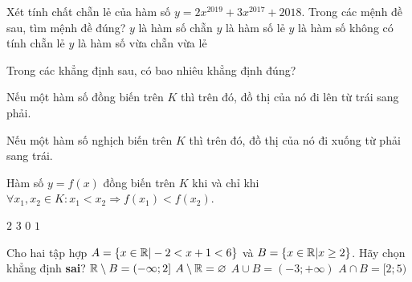\begin{ex}%
Xét tính chất chẵn lẻ của hàm số $y=2x^{2019}+3x^{2017}+2018$. Trong các mệnh đề sau, tìm
mệnh đề đúng?
	\choice
	{$y$ là hàm số chẵn}
	{$y$ là hàm số lẻ}
	{\True $y$ là hàm số không có tính chẵn lẻ}
	{$y$ là hàm số vừa chẵn vừa lẻ}
\end{ex}

\begin{ex}%
Trong các khẳng định sau, có bao nhiêu khẳng định đúng?
\begin{enumEX}[(I)]{1}
\item Nếu một hàm số đồng biến trên $K$ thì trên đó, đồ thị của nó đi lên từ trái sang phải.
\item Nếu một hàm số nghịch biến trên $K$ thì trên đó, đồ thị của nó đi xuống từ phải sang trái.
\item Hàm số $y=f(x)$ đồng biến trên $K$ khi và chỉ khi $\forall x_1, x_2\in K\colon x_1<x_2\Rightarrow f(x_1)<f(x_2)$.
\end{enumEX}
	\choice
	{\True $2$}
	{$3$}
	{$0$}
	{$1$}
\end{ex}

\begin{ex}%
Cho hai tập hợp $A=\{x\in \Bbb{R}|-2<x+1<6\}$ và $B=\{x\in \Bbb{R}|x\ge 2\}$. Hãy chọn khẳng định {\bf sai}?
	\choice
	{\True $\Bbb{R}\setminus B=(-\infty;2]$}
	{$A\setminus \Bbb{R}=\varnothing$}
	{$A\cup B=(-3;+\infty)$}
	{$A\cap B=[2;5)$}
	\loigiai{
Ta có $-2<x+1<6\Leftrightarrow -3<x<5\Rightarrow A=(-3;5)$ và $B=[2;+\infty)$.\\
Do đó $\Bbb{R}\setminus B=(-\infty;2)$.
	}
\end{ex}

